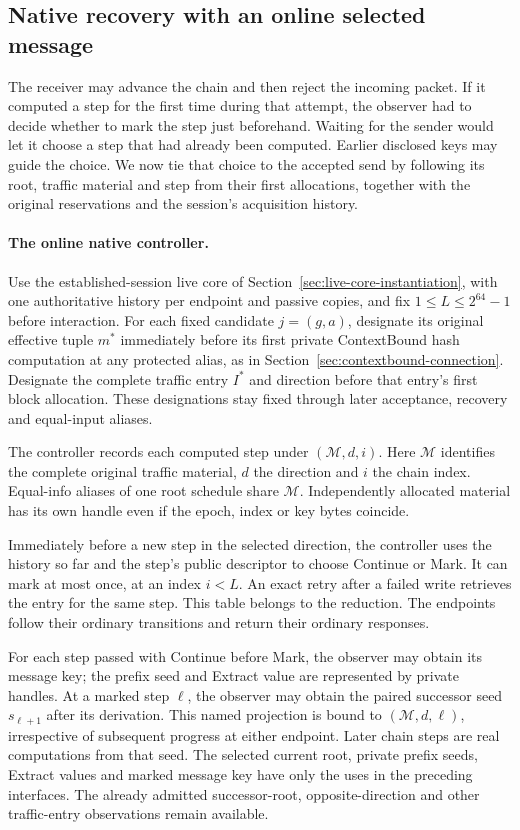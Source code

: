 \subsection{Native recovery with an online selected message}
\label{sec:native-online-chain}

The receiver may advance the chain and then reject the incoming
packet. If it computed a step for the first time during that attempt,
the observer had to decide whether to mark the step just beforehand.
Waiting for the sender would let it choose a step that had already
been computed. Earlier disclosed keys may guide the choice. We now
tie that choice to the accepted send by following its root, traffic
material and step from their first allocations, together with the
original reservations and the session's acquisition history.

\paragraph{The online native controller.}
Use the established-session live core of
Section~\ref{sec:live-core-instantiation}, with one authoritative history
per endpoint and passive copies, and fix $1\le L\le2^{64}-1$ before
interaction. For each fixed candidate $j=(g,a)$, designate its original
effective tuple $m^*$ immediately before its first private ContextBound
hash computation at any protected alias, as in
Section~\ref{sec:contextbound-connection}. Designate the complete
traffic entry $I^*$ and direction before that entry's first block allocation.
These designations stay fixed through later acceptance, recovery and
equal-input aliases.

The controller records each computed step under $(\mathcal M,d,i)$.
Here $\mathcal M$ identifies the complete original traffic material,
$d$ the direction and $i$ the chain index. Equal-info aliases of one
root schedule share $\mathcal M$. Independently allocated material has
its own handle even if the epoch, index or key bytes coincide.

Immediately before a new step in the selected direction, the controller
uses the history so far and the step's public descriptor to choose
Continue or Mark. It can mark at most once, at an index $i<L$. An exact retry after a
failed write retrieves the entry for the same step. This table belongs
to the reduction. The endpoints follow their ordinary transitions and
return their ordinary responses.

For each step passed with Continue before Mark, the observer may obtain
its message key; the prefix seed and Extract value are represented by
private handles. At a marked
step $\ell$, the observer may obtain the paired successor seed
$s_{\ell+1}$ after its derivation. This named projection is bound to
$(\mathcal M,d,\ell)$, irrespective of subsequent progress at either
endpoint. Later chain steps are real computations from that seed.
The selected current root, private prefix seeds, Extract values and
marked message key have only the uses in the preceding interfaces.
The already admitted successor-root, opposite-direction and other
traffic-entry observations remain available.

